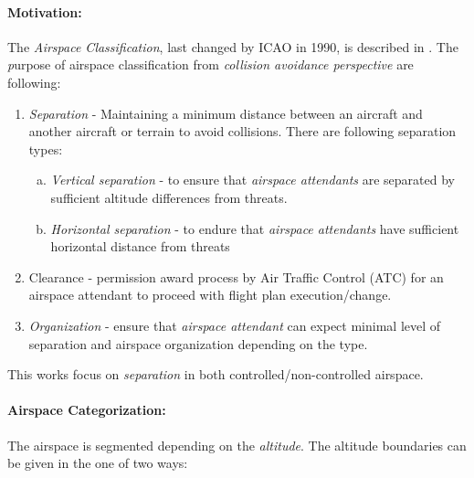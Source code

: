 \setcounter{chapter}{6}
\setcounter{section}{7}
\setcounter{subsection}{3}
\paragraph{Motivation:} The \emph{Airspace Classification}, last changed by ICAO in 1990, is described in \cite{icaoAnnex11}. The \emph purpose of airspace classification from \emph{collision avoidance perspective} are following:

\begin{enumerate}
    \item \emph{Separation} - Maintaining a minimum distance between an aircraft and another aircraft or terrain to avoid collisions. There are following separation types:
    \begin{enumerate}[a.]
        \item \emph{Vertical separation} - to ensure that \emph{airspace attendants} are separated by sufficient altitude differences from threats.
        
        \item \emph{Horizontal  separation} - to endure that \emph{airspace attendants} have sufficient horizontal distance from threats
    \end{enumerate}
    
    \item{Clearance} - permission award process by Air Traffic Control (ATC) for an airspace attendant to proceed with flight plan execution/change.
    
    \item \emph{Organization} - ensure that \emph{airspace attendant} can expect minimal level of separation and airspace organization depending on the type.
\end{enumerate}

\begin{note}
    This works focus on \emph{separation} in both controlled/non-controlled airspace.
\end{note}

\paragraph{Airspace Categorization:} The airspace is segmented depending on the \emph{altitude}. The altitude boundaries can be given in the one of two ways:

